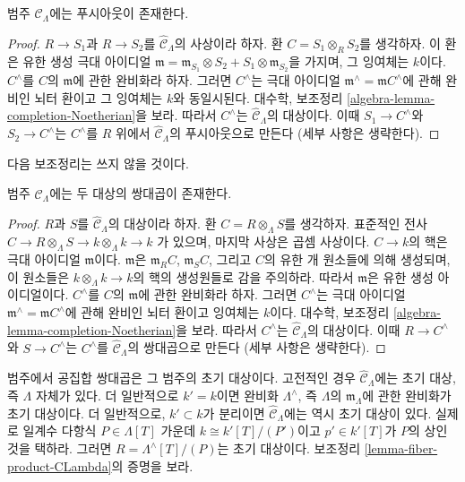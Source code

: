 \begin{lemma}
\label{lemma-CLambdahat-pushouts}
범주 $\widehat{\mathcal{C}}_\Lambda$에는 푸시아웃이 존재한다.
\end{lemma}

\begin{proof}
$R \to S_1$과 $R \to S_2$를
$\widehat{\mathcal{C}}_\Lambda$의 사상이라 하자. 환
$C = S_1 \otimes_R S_2$를 생각하자.
이 환은 유한 생성 극대 아이디얼
$\mathfrak m = \mathfrak m_{S_1} \otimes S_2 +
S_1 \otimes \mathfrak m_{S_2}$을 가지며, 그 잉여체는 $k$이다.
$C^\wedge$를 $C$의 $\mathfrak m$에 관한 완비화라 하자.
그러면 $C^\wedge$는 극대 아이디얼
$\mathfrak m^\wedge = \mathfrak mC^\wedge$에 관해 완비인 뇌터 환이고
그 잉여체는 $k$와 동일시된다. 대수학, 보조정리
\ref{algebra-lemma-completion-Noetherian}을 보라.
따라서 $C^\wedge$는 $\widehat{\mathcal{C}}_\Lambda$의 대상이다.
이때 $S_1 \to C^\wedge$와 $S_2 \to C^\wedge$는 $C^\wedge$를
$R$ 위에서 $\widehat{\mathcal{C}}_\Lambda$의 푸시아웃으로 만든다
(세부 사항은 생략한다).
\end{proof}

\noindent
다음 보조정리는 쓰지 않을 것이다.

\begin{lemma}
\label{lemma-CLambdahat-coproducts}
범주 $\widehat{\mathcal{C}}_\Lambda$에는 두 대상의 쌍대곱이 존재한다.
\end{lemma}

\begin{proof}
$R$과 $S$를 $\widehat{\mathcal{C}}_\Lambda$의 대상이라 하자.
환 $C = R \otimes_\Lambda S$를 생각하자. 표준적인 전사
$C \to R \otimes_\Lambda S \to k \otimes_\Lambda k \to k$
가 있으며, 마지막 사상은 곱셈 사상이다. $C \to k$의 핵은 극대 아이디얼
$\mathfrak m$이다. $\mathfrak m$은 $\mathfrak m_R C$,
$\mathfrak m_S C$, 그리고 $C$의 유한 개 원소들에 의해 생성되며,
이 원소들은 $k \otimes_\Lambda k \to k$의 핵의 생성원들로 감을
주의하라.
따라서 $\mathfrak m$은 유한 생성 아이디얼이다.
$C^\wedge$를 $C$의 $\mathfrak m$에 관한 완비화라 하자.
그러면 $C^\wedge$는 극대 아이디얼
$\mathfrak m^\wedge = \mathfrak mC^\wedge$에 관해 완비인 뇌터 환이고
잉여체는 $k$이다. 대수학, 보조정리
\ref{algebra-lemma-completion-Noetherian}을 보라.
따라서 $C^\wedge$는 $\widehat{\mathcal{C}}_\Lambda$의 대상이다.
이때 $R \to C^\wedge$와 $S \to C^\wedge$는 $C^\wedge$를
$\widehat{\mathcal{C}}_\Lambda$의 쌍대곱으로 만든다
(세부 사항은 생략한다).
\end{proof}

\noindent
범주에서 공집합 쌍대곱은 그 범주의 초기 대상이다.
고전적인 경우 $\widehat{\mathcal{C}}_\Lambda$에는 초기 대상,
즉 $\Lambda$ 자체가 있다. 더 일반적으로 $k' = k$이면
완비화 $\Lambda^\wedge$, 즉 $\Lambda$의
$\mathfrak m_\Lambda$에 관한 완비화가 초기 대상이다. 더 일반적으로,
$k' \subset k$가 분리이면 $\widehat{\mathcal{C}}_\Lambda$에는
역시 초기 대상이 있다. 실제로 일계수 다항식
$P \in \Lambda[T]$ 가운데 $k \cong k'[T]/(P')$이고
$p' \in k'[T]$가 $P$의 상인 것을 택하라.
그러면 $R = \Lambda^\wedge[T]/(P)$는 초기 대상이다. 보조정리
\ref{lemma-fiber-product-CLambda}의 증명을 보라.

